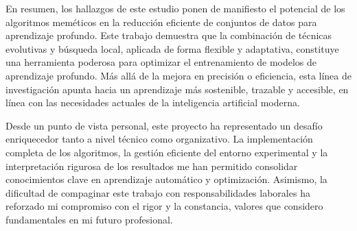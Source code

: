 En resumen, los hallazgos de este estudio ponen de manifiesto el potencial de los algoritmos meméticos en la reducción eficiente de conjuntos de datos para aprendizaje profundo.
Este trabajo demuestra que la combinación de técnicas evolutivas y búsqueda local, aplicada de forma flexible y adaptativa,
constituye una herramienta poderosa para optimizar el entrenamiento de modelos de aprendizaje profundo.
Más allá de la mejora en precisión o eficiencia, esta línea de investigación apunta hacia un aprendizaje más sostenible, trazable y accesible,
en línea con las necesidades actuales de la inteligencia artificial moderna.

Desde un punto de vista personal, este proyecto ha representado un desafío enriquecedor tanto a nivel técnico como organizativo.
La implementación completa de los algoritmos, la gestión eficiente del entorno experimental y
la interpretación rigurosa de los resultados me han permitido consolidar conocimientos clave en aprendizaje automático y optimización.
Asimismo, la dificultad de compaginar este trabajo con responsabilidades laborales ha reforzado mi compromiso con el rigor y la constancia,
valores que considero fundamentales en mi futuro profesional.